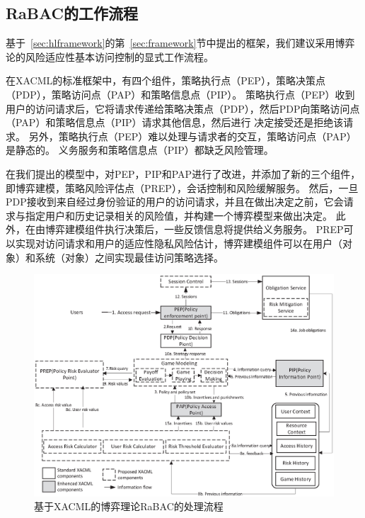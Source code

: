 \subsection{RaBAC的工作流程}


基于~\ref{sec:hlframework}的第~\ref{sec:framework}节中提出的框架，我们建议采用博弈论的风险适应性基本访问控制的显式工作流程。

在XACML的标准框架中，有四个组件，策略执行点（PEP），策略决策点（PDP），策略访问点（PAP）和策略信息点（PIP）。 策略执行点（PEP）收到用户的访问请求后，它将请求传递给策略决策点（PDP），然后PDP向策略访问点（PAP）和策略信息点（PIP）请求其他信息，然后进行 决定接受还是拒绝该请求。 另外，策略执行点（PEP）难以处理与请求者的交互，策略访问点（PAP）是静态的。 义务服务和策略信息点（PIP）都缺乏风险管理。


在我们提出的模型中，对PEP，PIP和PAP进行了改进，并添加了新的三个组件，即博弈建模，策略风险评估点（PREP），会话控制和风险缓解服务。 然后，一旦PDP接收到来自经过身份验证的用户的访问请求，并且在做出决定之前，它会请求与指定用户和历史记录相关的风险值，并构建一个博弈模型来做出决定。 此外，在由博弈建模组件执行决策后，一些反馈信息将提供给义务服务。 PREP可以实现对访问请求和用户的适应性隐私风险估计，博弈建模组件可以在用户（对象）和系统（对象）之间实现最佳访问策略选择。

\begin{figure}[htb]
	\centering
	\includegraphics[width=1\textwidth]{./figures/game-rbac-workflow.eps}
	\caption{基于XACML的博弈理论RaBAC的处理流程}\label{fig:game-rbac-workflow}
\end{figure}


